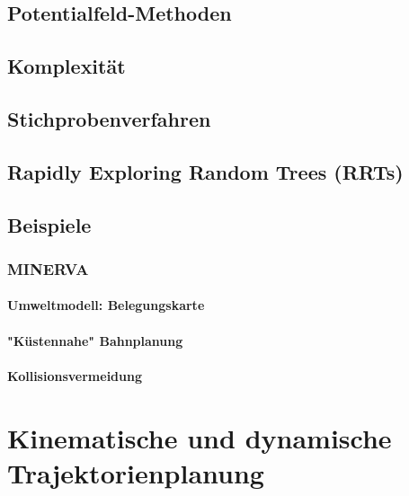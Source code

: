 \documentclass[a4paper, 11pt, accentcolor = tud3b]{tudreport}
\begin{document}
			\subsection{Potentialfeld-Methoden} %

			\subsection{Komplexität} %

			\subsection{Stichprobenverfahren} %

			\subsection{Rapidly Exploring Random Trees (RRTs)} %

			\subsection{Beispiele} %

				\subsubsection{MINERVA} %

					\paragraph{Umweltmodell: Belegungskarte} %

					\paragraph{"Küstennahe" Bahnplanung} %

					\paragraph{Kollisionsvermeidung} %

		\section{Kinematische und dynamische Trajektorienplanung} %
\end{document}
